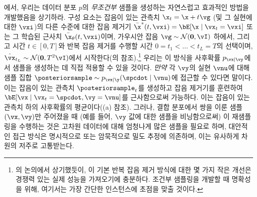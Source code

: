 \documentclass[../../book-main_ko.tex]{subfiles}
\begin{document}
에서, 우리는 데이터 분포 $p$의 \textit{무조건부} 샘플을 생성하는 자연스럽고 효과적인 방법을 개발했음을 상기하라. 구성 요소는 잡음이 있는 관측치 $\x_t = \x + t \vg$ (및 그 실현에 대한 $\vxi$)의 다른 수준에 대한 잡음 제거기 $\bar{\x}^\ast(t, \vxi) = \bE[ \x \mid \vx_t=\vxi ]$ 또는 그 학습된 근사치 $\bar{\x}_{\theta}(t, \vxi)$이며, 가우시안 잡음 $\vg \sim \mathcal{N}(\mathbf{0}, \vI)$ 하에서, 그리고 시간 $t \in [0, T]$와 반복 잡음 제거를 수행할 시간 $0 = t_1 < \hdots < t_{L} = T$의 선택이며, $\hat{\vx}_{t_L} \sim \mathcal{N}(\mathbf{0}, T^2 \vI)$에서 시작한다(의  참조).\footnote{의 논의에서 상기했듯이, 이 기본 반복 잡음 제거 방식에 대한 몇 가지 작은 개선은 경쟁력 있는 실제 성능을 가져오기에 충분하다. 조건부 샘플링을 개발할 때 명확성을 위해, 여기서는 가장 간단한 인스턴스에 초점을 맞출 것이다.} 우리는 이 방식을 사후확률 $p_{\vx \mid \vy}$에서 샘플을 생성하는 데 직접 적용할 수 있을 것이다. \textit{만약} 각 $\vy$의 실현 $\vnu$에 대해 샘플 집합 $\posteriorsample \sim p_{\vx \mid \y}(\spcdot \mid \vnu)$에 접근할 수 있다면 말이다. 이는 잡음이 있는 관측치 $\posteriorsample_t$를 생성하고 잡음 제거기를 훈련하여 $\bE[ \vx \mid \vx_t=\spcdot, \vy=\vnu ]$를 근사함으로써 가능하다. 이는 잡음이 있는 관측치 하의 사후확률의 평균이다((a) 참조).
그러나, 결합 분포에서 쌍을 이룬 샘플 $(\vx, \vy)$만 주어졌을 때 (예를 들어, $\vy$ 값에 대한 샘플을 비닝함으로써) 이 재샘플링을 수행하는 것은 고차원 데이터에 대해 엄청나게 많은 샘플을 필요로 하며, 대안적인 접근 방식은 명시적으로 또는 암묵적으로 밀도 추정에 의존하며, 이는 유사하게 차원의 저주로 고통받는다.
\end{document}
